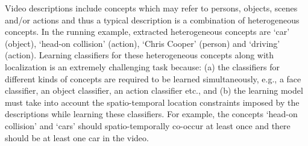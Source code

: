 \documentclass[runningheads]{llncs}
\begin{document}
Video descriptions include concepts which may refer to persons, objects, scenes and/or
actions and thus a typical description is a combination of heterogeneous concepts. In the running example, extracted heterogeneous concepts are `car' (object), `head-on collision' (action), `Chris Cooper' (person) and `driving' (action). Learning classifiers for these heterogeneous concepts along with localization is an extremely challenging task because: (a) the classifiers for different kinds of concepts are required to be learned simultaneously, e.g., a face classifier, an object classifier, an action classifier etc., and (b) the learning model must take into account the spatio-temporal location constraints imposed by the descriptions while learning these classifiers. For example, the concepts `head-on collision' and `cars' should spatio-temporally co-occur at least once and there should be at least one car in the video. 
\end{document}
